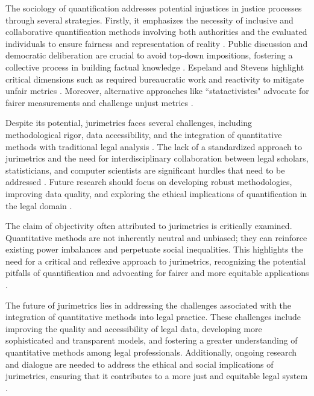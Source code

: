 The sociology of quantification addresses potential injustices in justice processes through several strategies. Firstly, it emphasizes the necessity of inclusive and collaborative quantification methods involving both authorities and the evaluated individuals to ensure fairness and representation of reality \cite{salais2016}. Public discussion and democratic deliberation are crucial to avoid top-down impositions, fostering a collective process in building factual knowledge \cite{salais2016}. Espeland and Stevens highlight critical dimensions such as required bureaucratic work and reactivity to mitigate unfair metrics \cite{saltelli2020}. Moreover, alternative approaches like “statactivistes" advocate for fairer measurements and challenge unjust metrics \cite{saltelli2020}.

Despite its potential, jurimetrics faces several challenges, including methodological rigor, data accessibility, and the integration of quantitative methods with traditional legal analysis \cite{nunes2016jurimetria}. The lack of a standardized approach to jurimetrics and the need for interdisciplinary collaboration between legal scholars, statisticians, and computer scientists are significant hurdles that need to be addressed \cite{101111lsi12334}. Future research should focus on developing robust methodologies, improving data quality, and exploring the ethical implications of quantification in the legal domain \cite{101057s4159902003965}.

The claim of objectivity often attributed to jurimetrics is critically examined. Quantitative methods are not inherently neutral and unbiased; they can reinforce existing power imbalances and perpetuate social inequalities. This highlights the need for a critical and reflexive approach to jurimetrics, recognizing the potential pitfalls of quantification and advocating for fairer and more equitable applications \cite{10.1590/dados.2022.65.3.267,10.1057/s41599-020-00557-0}.

The future of jurimetrics lies in addressing the challenges associated with the integration of quantitative methods into legal practice. These challenges include improving the quality and accessibility of legal data, developing more sophisticated and transparent models, and fostering a greater understanding of quantitative methods among legal professionals. Additionally, ongoing research and dialogue are needed to address the ethical and social implications of jurimetrics, ensuring that it contributes to a more just and equitable legal system \cite{ribeiro2021quantification}.

